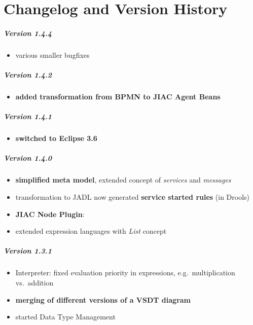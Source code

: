 \chapter{Changelog and Version History}
\label{sec:changelog}


\paragraph{Version 1.4.4}

\begin{itemize}
	\item various smaller bugfixes
\end{itemize}

\paragraph{Version 1.4.2}

\begin{itemize}
	\item \textbf{added transformation from BPMN to JIAC Agent Beans}
\end{itemize}

\paragraph{Version 1.4.1}

\begin{itemize}
	\item \textbf{switched to Eclipse 3.6}
\end{itemize}

\paragraph{Version 1.4.0}

\begin{itemize}
	\item \textbf{simplified meta model}, extended concept of \emph{services} and \emph{messages}
	\item transformation to JADL now generated \textbf{service started rules} (in Drools)
	\item \textbf{JIAC Node Plugin}:
	\item extended expression languages with \emph{List} concept
\end{itemize}

\paragraph{Version 1.3.1}
\begin{itemize}
	\item Interpreter: fixed evaluation priority in expressions, e.g.\ multiplication vs.\ addition
	\item \textbf{merging of different versions of a VSDT diagram}
	\item started Data Type Management
\end{itemize}

